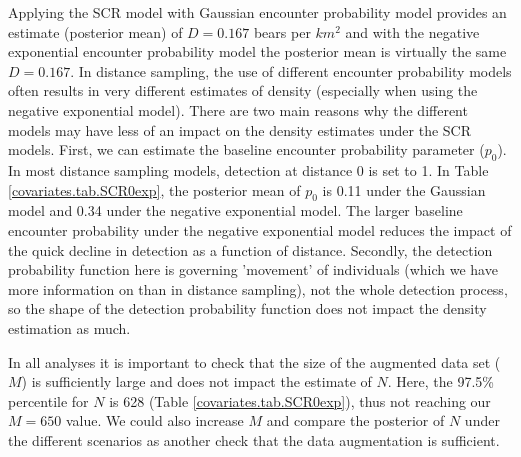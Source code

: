 Applying the SCR model with Gaussian encounter probability model
 provides an
estimate (posterior mean) of $D = 0.167$ bears per $km^2$ and with the
negative exponential encounter probability model
the posterior mean  is virtually the
same $D = 0.167$.  In distance sampling, the use of different
encounter probability models
 often results in very different estimates of density
(especially when using the negative exponential model).  There are
two main reasons why the different models  may have less of
an impact on the density estimates under the SCR models.  First, we
can estimate the baseline encounter probability
 parameter ($p_0$).  
In most
distance sampling models, detection at distance 0 is set to 1.  In
Table \ref{covariates.tab.SCR0exp}, the posterior mean of $p_0$ is
0.11 under the Gaussian  model and 0.34 under the negative
exponential model.  The larger baseline encounter probability
 under the negative
exponential model reduces the impact of the quick decline in detection as
a function of distance.
Secondly, the detection probability function here is governing 'movement' of
individuals (which we have more information on than in distance
sampling), not the whole detection process, so the shape of the
detection probability function does not impact the density estimation as much.

In all analyses it is important to check that the size of the
augmented data set ($M$) is sufficiently large and does not impact 
the estimate of $N$.  Here, the 97.5\%
percentile for $N$ is 628 (Table \ref{covariates.tab.SCR0exp}), thus not reaching our $M=650$ value.
We could also increase
$M$ and compare the posterior of $N$ under the different scenarios as another check 
that the data augmentation is sufficient.  

